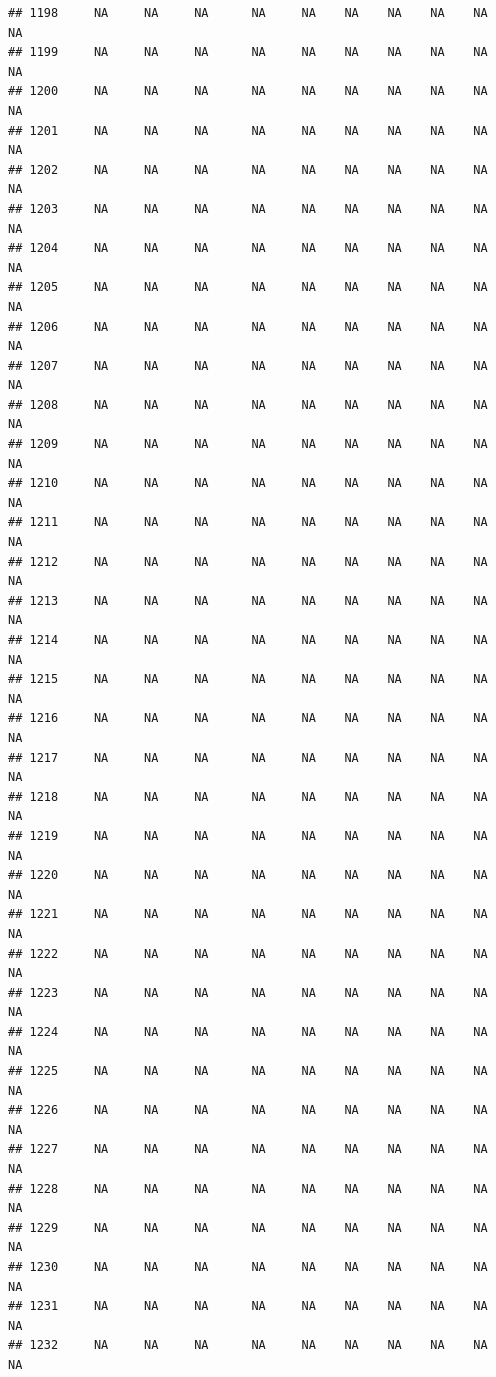 \documentclass{article}\usepackage{graphicx, color}
\makeatletter
\newenvironment{kframe}{%
 \def\at@end@of@kframe{}%
 \ifinner\ifhmode%
  \def\at@end@of@kframe{\end{minipage}}%
  \begin{minipage}{\columnwidth}%
 \fi\fi%
 \def\FrameCommand##1{\hskip\@totalleftmargin \hskip-\fboxsep
 \colorbox{shadecolor}{##1}\hskip-\fboxsep
     \hskip-\linewidth \hskip-\@totalleftmargin \hskip\columnwidth}%
 \MakeFramed {\advance\hsize-\width
   \@totalleftmargin\z@ \linewidth\hsize
   \@setminipage}}%
 {\par\unskip\endMakeFramed%
 \at@end@of@kframe}
\newenvironment{knitrout}{}{} %
\makeatother
\begin{document}
\begin{knitrout}
\begin{kframe}
\begin{verbatim}
## 1198     NA     NA     NA      NA     NA    NA    NA    NA    NA     NA
## 1199     NA     NA     NA      NA     NA    NA    NA    NA    NA     NA
## 1200     NA     NA     NA      NA     NA    NA    NA    NA    NA     NA
## 1201     NA     NA     NA      NA     NA    NA    NA    NA    NA     NA
## 1202     NA     NA     NA      NA     NA    NA    NA    NA    NA     NA
## 1203     NA     NA     NA      NA     NA    NA    NA    NA    NA     NA
## 1204     NA     NA     NA      NA     NA    NA    NA    NA    NA     NA
## 1205     NA     NA     NA      NA     NA    NA    NA    NA    NA     NA
## 1206     NA     NA     NA      NA     NA    NA    NA    NA    NA     NA
## 1207     NA     NA     NA      NA     NA    NA    NA    NA    NA     NA
## 1208     NA     NA     NA      NA     NA    NA    NA    NA    NA     NA
## 1209     NA     NA     NA      NA     NA    NA    NA    NA    NA     NA
## 1210     NA     NA     NA      NA     NA    NA    NA    NA    NA     NA
## 1211     NA     NA     NA      NA     NA    NA    NA    NA    NA     NA
## 1212     NA     NA     NA      NA     NA    NA    NA    NA    NA     NA
## 1213     NA     NA     NA      NA     NA    NA    NA    NA    NA     NA
## 1214     NA     NA     NA      NA     NA    NA    NA    NA    NA     NA
## 1215     NA     NA     NA      NA     NA    NA    NA    NA    NA     NA
## 1216     NA     NA     NA      NA     NA    NA    NA    NA    NA     NA
## 1217     NA     NA     NA      NA     NA    NA    NA    NA    NA     NA
## 1218     NA     NA     NA      NA     NA    NA    NA    NA    NA     NA
## 1219     NA     NA     NA      NA     NA    NA    NA    NA    NA     NA
## 1220     NA     NA     NA      NA     NA    NA    NA    NA    NA     NA
## 1221     NA     NA     NA      NA     NA    NA    NA    NA    NA     NA
## 1222     NA     NA     NA      NA     NA    NA    NA    NA    NA     NA
## 1223     NA     NA     NA      NA     NA    NA    NA    NA    NA     NA
## 1224     NA     NA     NA      NA     NA    NA    NA    NA    NA     NA
## 1225     NA     NA     NA      NA     NA    NA    NA    NA    NA     NA
## 1226     NA     NA     NA      NA     NA    NA    NA    NA    NA     NA
## 1227     NA     NA     NA      NA     NA    NA    NA    NA    NA     NA
## 1228     NA     NA     NA      NA     NA    NA    NA    NA    NA     NA
## 1229     NA     NA     NA      NA     NA    NA    NA    NA    NA     NA
## 1230     NA     NA     NA      NA     NA    NA    NA    NA    NA     NA
## 1231     NA     NA     NA      NA     NA    NA    NA    NA    NA     NA
## 1232     NA     NA     NA      NA     NA    NA    NA    NA    NA     NA

\end{verbatim}
\end{kframe}
\end{knitrout}
\end{document}
